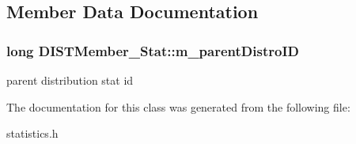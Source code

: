 \subsection{Member Data Documentation}
\hypertarget{classDISTMember__Stat_a161cdc74a36982281bcbfb0240509f44}{
\subsubsection[{m\_\-parentDistroID}]{\setlength{\rightskip}{0pt plus 5cm}long {\bf DISTMember\_\-Stat::m\_\-parentDistroID}}}
\label{classDISTMember__Stat_a161cdc74a36982281bcbfb0240509f44}
parent distribution stat id 

The documentation for this class was generated from the following file:\begin{DoxyCompactItemize}
\item 
statistics.h\end{DoxyCompactItemize}
